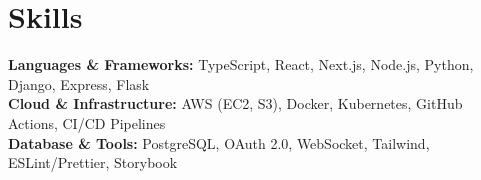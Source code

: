 \section{Skills}

\begin{onecolentry}
    \textbf{Languages \& Frameworks:} TypeScript, React, Next.js, Node.js, Python, Django, Express, Flask \\[0.2cm]
    \textbf{Cloud \& Infrastructure:} AWS (EC2, S3), Docker, Kubernetes, GitHub Actions, CI/CD Pipelines \\[0.2cm]
    \textbf{Database \& Tools:} PostgreSQL, OAuth 2.0, WebSocket, Tailwind, ESLint/Prettier, Storybook
\end{onecolentry}
